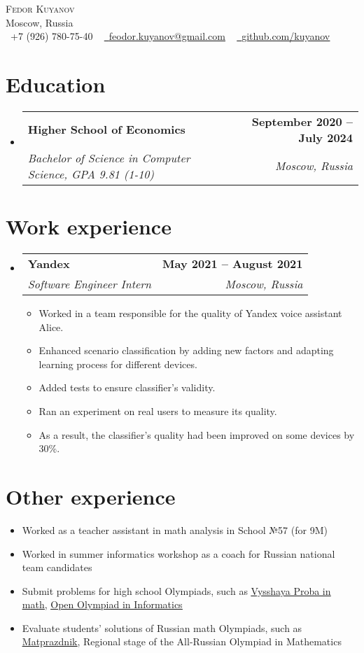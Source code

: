 \documentclass[letterpaper,11pt]{article}
\makeatletter
\newcommand{\resumeSubHeading}[4]{
    \item
    \begin{tabular*}{1.0\textwidth}[t]{l@{\extracolsep{\fill}}r}
        \textbf{#1} & \textbf{\small #2} \\
        \textit{\small #3} & \textit{\small #4} \\
    \end{tabular*}\vspace{-5pt}
}
\newcommand{\resumeSubHeadingListStart}{\begin{itemize}[leftmargin=0.0in, label={}]}
\newcommand{\resumeSubHeadingListEnd}{\end{itemize}}
\newcommand{\resumeItemListStart}{\begin{itemize}}
\newcommand{\resumeItemListEnd}{\end{itemize}\vspace{-8pt}}
\newcommand{\resumeItem}[1]{\item\small{{#1 \vspace{-2pt}}}}
\newcommand{\resumeSubItem}[1]{\resumeItem{#1}\vspace{-4pt}}
\makeatother
\begin{document}
\begin{center}
    {\Huge \scshape Fedor Kuyanov} \\ \vspace{3pt}
    Moscow, Russia \\ \vspace{5pt}
    \small \raisebox{-0.1\height}\faPhone\ +7 (926) 780-75-40 ~ \href{mailto:feodor.kuyanov@gmail.com}{\raisebox{-0.2\height}\faEnvelope\  \underline{feodor.kuyanov@gmail.com}} ~ 
    \href{https://github.com/kuyanov}{\raisebox{-0.2\height}\faGithub\ \underline{github.com/kuyanov}}
    \vspace{-8pt}
\end{center}


\section{Education}
    \resumeSubHeadingListStart
        \resumeSubHeading
        {Higher School of Economics}{September 2020 -- July 2024}
        {Bachelor of Science in Computer Science, GPA 9.81 (1-10)}{Moscow, Russia}
    \resumeSubHeadingListEnd


\section{Work experience}
    \resumeSubHeadingListStart
        \resumeSubHeading
        {Yandex}{May 2021 -- August 2021}
        {Software Engineer Intern}{Moscow, Russia}
        \resumeItemListStart
            \resumeItem{Worked in a team responsible for the quality of Yandex voice assistant Alice.}
            \resumeItem{Enhanced scenario classification by adding new factors and adapting learning process for different devices.}
            \resumeItem{Added tests to ensure classifier's validity.}
            \resumeItem{Ran an experiment on real users to measure its quality.}
            \resumeItem{As a result, the classifier's quality had been improved on some devices by 30\%.}
        \resumeItemListEnd
    \resumeSubHeadingListEnd


\section{Other experience}
    \resumeItemListStart
        \resumeSubItem{Worked as a teacher assistant in math analysis in School №57 (for 9M)}
        \resumeSubItem{Worked in summer informatics workshop as a coach for Russian national team candidates}
        \resumeSubItem{Submit problems for high school Olympiads, such as \href{https://olymp.hse.ru/mmo/math}{\underline{Vysshaya Proba in math}}, \href{https://olympiads.ru/zaoch}{\underline{Open Olympiad in Informatics}}}
        \resumeSubItem{Evaluate students' solutions of Russian math Olympiads, such as \href{https://olympiads.mccme.ru/matprazdnik}{\underline{Matprazdnik}}, Regional stage of the All-Russian Olympiad in Mathematics}
    \resumeItemListEnd
\end{document}
